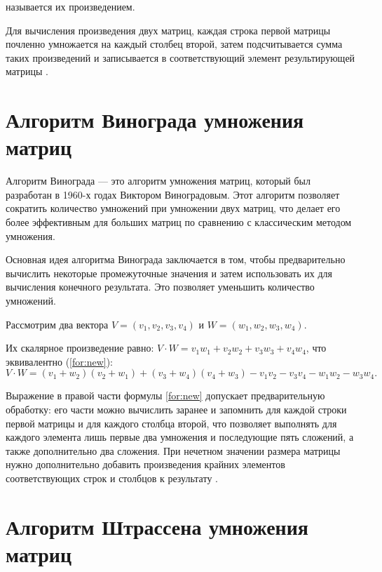 называется их произведением.

Для вычисления произведения двух матриц, каждая строка первой матрицы почленно умножается на каждый столбец второй, затем подсчитывается сумма таких произведений и записывается в соответствующий элемент результирующей матрицы \cite{alg}.

\section{Алгоритм Винограда умножения матриц}

Алгоритм Винограда — это алгоритм умножения матриц, который был разработан в 1960-х годах Виктором Виноградовым. Этот алгоритм позволяет сократить количество умножений при умножении двух матриц, что делает его более эффективным для больших матриц по сравнению с классическим методом умножения.

Основная идея алгоритма Винограда заключается в том, чтобы предварительно вычислить некоторые промежуточные значения и затем использовать их для вычисления конечного результата. Это позволяет уменьшить количество умножений.

Рассмотрим два вектора $V = (v_1, v_2, v_3, v_4)$ и $W = (w_1, w_2, w_3, w_4)$.

Их скалярное произведение равно: $V \cdot W = v_1w_1 + v_2w_2 + v_3w_3 + v_4w_4$, что эквивалентно (\ref{for:new}):
\begin{equation}
	\label{for:new}
	V \cdot W = (v_1 + w_2)(v_2 + w_1) + (v_3 + w_4)(v_4 + w_3) - v_1v_2 - v_3v_4 - w_1w_2 - w_3w_4.
\end{equation}

Выражение в правой части формулы \ref{for:new} допускает предварительную обработку: его части можно вычислить заранее и запомнить для каждой строки первой матрицы и для каждого
столбца второй, что позволяет выполнять для каждого элемента лишь первые два умножения и последующие пять сложений, а также дополнительно два сложения. При нечетном значении размера матрицы нужно дополнительно добавить произведения крайних элементов соответствующих строк и столбцов к результату \cite{alg}.

\section{Алгоритм Штрассена умножения матриц}

